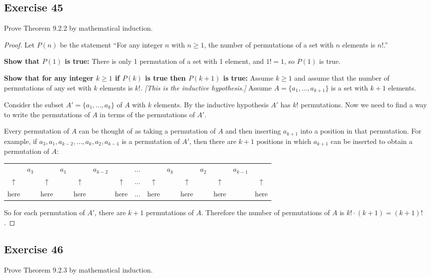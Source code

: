 \documentclass[14pt]{extarticle}
\begin{document}
\subsection{Exercise 45}
Prove Theorem 9.2.2 by mathematical induction.

\begin{proof}
Let \(P(n)\) be the statement ``For any integer $n$ with \(n \geq 1\), the number of permutations of a set with $n$ 
elements is \(n!\).''

{\bf Show that \(P(1)\) is true:} There is only 1 permutation of a set with 1 element, and \(1! = 1\), so 
\(P(1)\) is true.

{\bf Show that for any integer \(k \geq 1\) if \(P(k)\) is true then \(P(k+1)\) is true:} Assume \(k \geq 1\) and 
assume that the number of permutations of any set with $k$ elements is $k!$. {\it [This is the inductive hypothesis.]}
Assume \(A = \{a_1, \ldots, a_{k+1}\}\) is a set with $k+1$ elements.

Consider the subset \(A' = \{a_1, \ldots, a_k\}\) of $A$ with $k$ elements. By the inductive hypothesis $A'$ has 
$k!$ permutations. Now we need to find a way to write the permutations of $A$ in terms of the permutations of $A'$.

Every permutation of $A$ can be thought of as taking a permutation of $A$ and then inserting \(a_{k+1}\) into a
position in that permutation. For example, if \(a_3, a_1, a_{k-2}, \ldots, a_k, a_2, a_{k-1}\) is a permutation of 
$A'$, then there are $k+1$ positions in which \(a_{k+1}\) can be inserted to obtain a permutation of $A$:
\begin{center}
\begin{tabular}{ccccccccccccccc}
& \(a_3\) & & \(a_1\) & & \(a_{k-2}\) & & \(\ldots\) & & \(a_k\) & & \(a_2\) & & \(a_{k-1}\) & \\
\(\uparrow\) & & \(\uparrow\) & & \(\uparrow\) & & \(\uparrow\)& \(\ldots\) & \(\uparrow\) & & \(\uparrow\)& &\(\uparrow\)& & \(\uparrow\) \\
here & & here & & here & & here& \(\ldots\) & here & & here& &here& & here \\
\end{tabular}
\end{center}
So for each permutation of $A'$, there are $k+1$ permutations of $A$. Therefore the number of permutations 
of $A$ is \(k! \cdot (k+1) = (k+1)!\).
\end{proof}

\subsection{Exercise 46}
Prove Theorem 9.2.3 by mathematical induction.
\end{document}
